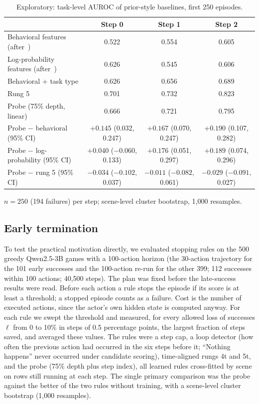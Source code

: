 \documentclass[11pt]{article}
\begin{document}
\begin{table}[t]
\centering\small
\caption{Exploratory: task-level AUROC of prior-style baselines, first 250 episodes.}\label{tab:prior}
\begin{tabularx}{\linewidth}{@{}Lccc@{}}
\toprule
 & Step 0 & Step 1 & Step 2 \\
\midrule
Behavioral features (after~\cite{ruan2026doomed}) & 0.522 & 0.554 & 0.605 \\
Log-probability features (after~\cite{pham2026agentstop}) & 0.626 & 0.545 & 0.606 \\
Behavioral + task type & 0.626 & 0.656 & 0.689 \\
Rung 5 & 0.701 & 0.732 & 0.823 \\
Probe (75\% depth, linear) & 0.666 & 0.721 & 0.795 \\
\addlinespace
Probe $-$ behavioral (95\% CI) & $+0.145$ (0.032, 0.247) & $+0.167$ (0.070, 0.247) & $+0.190$ (0.107, 0.282) \\
Probe $-$ log-probability (95\% CI) & $+0.040$ ($-0.060$, 0.133) & $+0.176$ (0.051, 0.297) & $+0.189$ (0.074, 0.296) \\
Probe $-$ rung 5 (95\% CI) & $-0.034$ ($-0.102$, 0.037) & $-0.011$ ($-0.082$, 0.061) & $-0.029$ ($-0.091$, 0.027) \\
\bottomrule
\end{tabularx}
\par\smallskip\raggedright\footnotesize
$n = 250$ (194 failures) per step; scene-level cluster bootstrap, 1,000 resamples.
\end{table}

\subsection{Early termination}\label{sec:early}
To test the practical motivation directly, we evaluated stopping rules on the 500 greedy Qwen2.5-3B games with a 100-action horizon
(the 30-action trajectory for the 101 early successes and the 100-action re-run for the other 399; 112 successes within 100 actions; 40,500 steps). The plan was fixed before the late-success results were read.
Before each action a rule stops the episode if its score is at least a threshold; a stopped episode counts as a failure. Cost is the number of executed actions, since the actor's own hidden state is computed anyway.
For each rule we swept the threshold and measured, for every allowed loss of successes $\ell$ from 0 to 10\% in steps of 0.5 percentage points, the largest fraction of steps saved, and averaged these values.
The rules were a step cap, a loop detector (how often the previous action had occurred in the six steps before it; ``Nothing happens'' never occurred under candidate scoring),
time-aligned rungs 4t and 5t, and the probe (75\% depth plus step index), all learned rules cross-fitted by scene on rows still running at each step.
The single primary comparison was the probe against the better of the two rules without training, with a scene-level cluster bootstrap (1,000 resamples).
\end{document}
